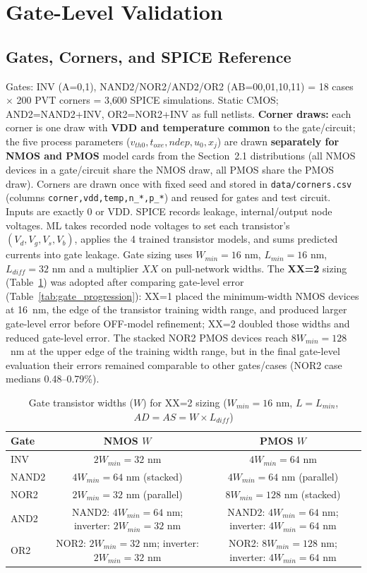 \documentclass[11pt,a4paper]{article}
\begin{document}
\section{Gate-Level Validation}

\subsection{Gates, Corners, and SPICE Reference}
Gates: INV (A=0,1), NAND2/NOR2/AND2/OR2 (AB=00,01,10,11) = 18 cases $\times$ 200 PVT corners = 3{,}600 SPICE simulations. Static CMOS; AND2=NAND2+INV, OR2=NOR2+INV as full netlists. \textbf{Corner draws:} each corner is one draw with \textbf{VDD and temperature common} to the gate/circuit; the five process parameters ($v_{th0},t_{oxe},ndep,u_0,x_j$) are drawn \textbf{separately for NMOS and PMOS} model cards from the Section~2.1 distributions (all NMOS devices in a gate/circuit share the NMOS draw, all PMOS share the PMOS draw). Corners are drawn once with fixed seed and stored in \texttt{data/corners.csv} (columns \texttt{corner,vdd,temp,n\_*,p\_*}) and reused for gates and test circuit. Inputs are exactly 0 or VDD. SPICE records leakage, internal/output node voltages. ML takes recorded node voltages to set each transistor's $(V_d,V_g,V_s,V_b)$, applies the 4 trained transistor models, and sums predicted currents into gate leakage.
Gate sizing uses $W_{min}=16$ nm, $L_{min}=16$ nm, $L_{diff}=32$ nm and a multiplier $XX$ on pull-network widths. The \textbf{XX=2} sizing (Table~\ref{tab:gate_widths}) was adopted after comparing gate-level error (Table~\ref{tab:gate_progression}): XX=1 placed the minimum-width NMOS devices at 16~nm, the edge of the transistor training width range, and produced larger gate-level error before OFF-model refinement; XX=2 doubled those widths and reduced gate-level error. The stacked NOR2 PMOS devices reach $8W_{min}=128$~nm at the upper edge of the training width range, but in the final gate-level evaluation their errors remained comparable to other gates/cases (NOR2 case medians 0.48--0.79\%).

\begin{table}[H]\centering\small
\caption{Gate transistor widths ($W$) for XX=2 sizing ($W_{min}=16$ nm, $L=L_{min}$, $AD=AS=W\times L_{diff}$)}
\label{tab:gate_widths}
\begin{tabular}{lcc}\toprule
Gate & NMOS $W$ & PMOS $W$\\\midrule
INV & $2W_{min}=32$ nm & $4W_{min}=64$ nm\\
NAND2 & $4W_{min}=64$ nm (stacked) & $4W_{min}=64$ nm (parallel)\\
NOR2 & $2W_{min}=32$ nm (parallel) & $8W_{min}=128$ nm (stacked)\\
AND2 & NAND2: $4W_{min}=64$ nm; inverter: $2W_{min}=32$ nm & NAND2: $4W_{min}=64$ nm; inverter: $4W_{min}=64$ nm\\
OR2 & NOR2: $2W_{min}=32$ nm; inverter: $2W_{min}=32$ nm & NOR2: $8W_{min}=128$ nm; inverter: $4W_{min}=64$ nm\\
\bottomrule\end{tabular}\end{table}
\end{document}
